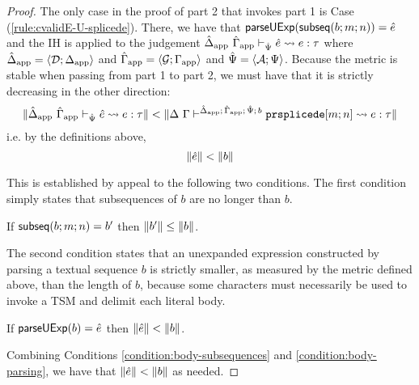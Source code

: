 \begin{proof}
The only case in the proof of part 2 that invokes part 1 is Case (\ref{rule:cvalidE-U-splicede}). There, we have that $\mathsf{parseUExp}(\mathsf{subseq}(b; m; n))={\hat e}$ and the IH is applied to the judgement $\hat{\Delta}_\text{app}~\hat{\Gamma}_\text{app} \vdash_{\hat{\Psi}} {\hat e} \leadsto e : \tau$ where $\hat{\Delta}_\text{app}=\langle \mathcal{D}; \Delta_\text{app} \rangle$ and $\hat{\Gamma}_\text{app}=\langle \mathcal{G}; \Gamma_\text{app} \rangle$ and $\hat{\Psi}=\langle \mathcal{A}; \Psi \rangle$. Because the metric is stable when passing from part 1 to part 2, we must have that it is strictly decreasing in the other direction:
\[\Vert \hat{\Delta}_\text{app}~\hat{\Gamma}_\text{app} \vdash_{\hat{\Psi}} {\hat e} \leadsto e : \tau \Vert < \Vert \Delta~\Gamma\vdash^{\hat{\Delta}_\text{app};\,\hat{\Gamma}_\text{app};\,\hat{\Psi};\,b} \texttt{prsplicede}[m; n] \leadsto e : \tau \Vert\]
i.e. by the definitions above, 
\[\Vert {\hat e} \Vert < \Vert b \Vert\]

This is established by appeal to the following two conditions. The first condition simply states that subsequences of $b$ are no longer than $b$.
\begin{condition}\label{condition:body-subsequences} If $\mathsf{subseq}(b; m; n)=b'$ then $\Vert b' \Vert \leq \Vert b \Vert$. \end{condition}
The second condition states that an unexpanded expression constructed by parsing a textual sequence $b$ is strictly smaller, as measured by the metric defined above, than the length of $b$, because some characters must necessarily be used to invoke a TSM and delimit each literal body.
\begin{condition}\label{condition:body-parsing} If $\mathsf{parseUExp}(b)={\hat e}$ then $\Vert {\hat e} \Vert < \Vert b \Vert$.\end{condition}

Combining Conditions \ref{condition:body-subsequences} and \ref{condition:body-parsing}, we have that $\Vert {\hat e} \Vert < \Vert b \Vert$ as needed.
\end{proof}

